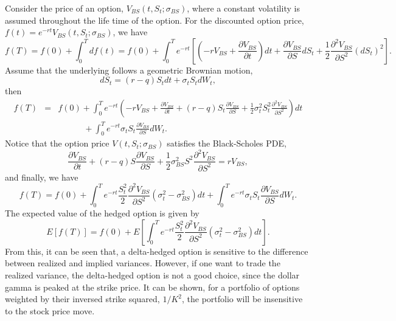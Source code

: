 \documentclass[12pt]{article}
\begin{document}
    Consider the price of an option, $V_{BS}(t,S_t;\sigma_{BS})$, where a constant volatility is assumed throughout the life time of the option.
    For the discounted option price, $f(t)=e^{-rt}V_{BS}(t,S_t;\sigma_{BS})$, we have
    \begin{equation}
      f(T)=f(0)+\int_0^Tdf(t)=f(0)+\int_0^Te^{-rt}\left[\left(-rV_{BS}+\frac{\partial V_{BS}}{\partial t}\right)dt+\frac{\partial V_{BS}}{\partial S}dS_t
              +\frac{1}{2}\frac{\partial^2 V_{BS}}{\partial S^2}\left(dS_t\right)^2\right].
    \end{equation}
    Assume that the underlying follows a geometric Brownian motion,
    \begin{equation}
      dS_t = \left(r-q\right)S_tdt + \sigma_tS_tdW_t,
    \end{equation}
    then
    \begin{eqnarray}
      f(T)&=&f(0)+\int_0^Te^{-rt}\left(-rV_{BS}+\frac{\partial V_{BS}}{\partial t}+\left(r-q\right)S_t\frac{\partial V_{BS}}{\partial S}
                                +\frac{1}{2}\sigma_t^2S_t^2\frac{\partial^2 V_{BS}}{\partial S^2}\right)dt\nonumber\\
          &&\quad\quad\quad+\int_0^Te^{-rt}\sigma_tS_t\frac{\partial V_{BS}}{\partial S}dW_t.
    \end{eqnarray}
    Notice that the option price $V(t,S_t;\sigma_{BS})$ satisfies the Black-Scholes PDE,
    \begin{equation}
      \frac{\partial V_{BS}}{\partial t}+\left(r-q\right)S\frac{\partial V_{BS}}{\partial S}+\frac{1}{2}\sigma_{BS}^2S^2\frac{\partial^2 V_{BS}}{\partial S^2}
      =rV_{BS},
    \end{equation}
    and finally, we have
    \begin{equation}
      f(T)=f(0)+\int_0^Te^{-rt}\frac{S_t^2}{2}\frac{\partial^2 V_{BS}}{\partial S^2}\left(\sigma_t^2-\sigma_{BS}^2\right)dt+\int_0^Te^{-rt}\sigma_tS_t\frac{\partial V_{BS}}{\partial S}dW_t.
    \end{equation}
    The expected value of the hedged option is given by
    \begin{equation}
      E\left[f(T)\right]=f(0)+E\left[\int_0^Te^{-rt}\frac{S_t^2}{2}\frac{\partial^2 V_{BS}}{\partial S^2}\left(\sigma_t^2-\sigma_{BS}^2\right)dt\right].
    \end{equation}
    From this, it can be seen that, a delta-hedged option is sensitive to the difference between realized and implied variances. However, if one want to trade
    the realized variance, the delta-hedged option is not a good choice, since the dollar gamma is peaked at the strike price. It can be shown, for a portfolio
    of options weighted by their inversed strike squared, $1/K^2$, the portfolio will be insensitive to the stock price move.
\end{document}
